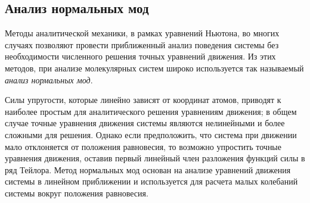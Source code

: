 




\subsection{Анализ нормальных мод}

Методы аналитической механики, в рамках уравнений Ньютона, во многих случаях позволяют провести приближенный анализ поведения системы без необходимости численного решения точных уравнений движения. Из этих методов, при анализе молекулярных систем широко используется так называемый \textit{анализ нормальных мод}. 

Силы упругости, которые линейно зависят от координат атомов, приводят к наиболее простым для аналитического решения уравнениям движения; в общем случае точные уравнения движения системы являются нелинейными и более сложными для решения. Однако если предположить, что система при движении мало отклоняется от положения равновесия, то возможно упростить точные уравнения движения, оставив первый линейный член разложения функций силы в ряд Тейлора. Метод нормальных мод основан на анализе уравнений движения системы в линейном приближении и используется для расчета малых колебаний системы вокруг положения равновесия.

